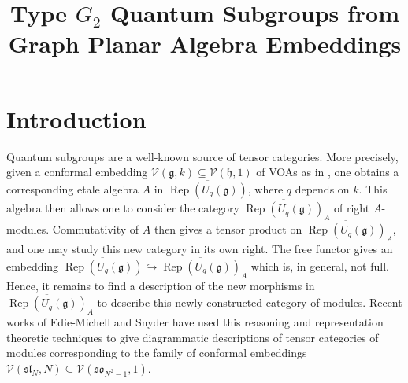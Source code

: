 \documentclass[pdflatex,sn-mathphys-num]{sn-jnl}%
\theoremstyle{thmstyleone}%
\theoremstyle{thmstyletwo}%
\theoremstyle{thmstylethree}%
\newcommand{\VV}{\mathcal{V}}
\newcommand{\ol}{\overline}
\renewcommand{\gg}{\mathfrak{g}}
\newcommand{\hh}{\mathfrak{h}}
\renewcommand{\sl}{\mathfrak{sl}}
\newcommand{\so}{\mathfrak{so}}
\DeclareMathOperator{\Rep}{Rep}
\begin{document}
\title{Type $G_2$ Quantum Subgroups from Graph Planar Algebra Embeddings}


\author{ }


\maketitle


\section{Introduction}\label{sec:intro}
Quantum subgroups are a well-known source of tensor categories.
More precisely, given a conformal embedding $\VV(\gg,k) \subseteq \VV(\hh,1)$ of VOAs 
as in \cite{DMNO}, one obtains a corresponding etale algebra $A$ in $\ol{\Rep(U_{q}(\gg))}$,
where $q$ depends on $k$.
This algebra then allows one to consider the category $\ol{\Rep(U_{q}(\gg))}_A$ of right $A$-modules.
Commutativity of $A$ then gives a tensor product on $\ol{\Rep(U_{q}(\gg))}_A$, and one may study this
new category in its own right.
The free functor gives an embedding $\ol{\Rep(U_{q}(\gg))} \hookrightarrow \ol{\Rep(U_{q}(\gg))}_A$
which is, in general, not full.
Hence, it remains to find a description of the new morphisms in $\ol{\Rep(U_{q}(\gg))}_A$ 
to describe this newly constructed category of modules.
Recent works of Edie-Michell and Snyder \cite{cain_noah} have used this reasoning and 
representation theoretic techniques to give diagrammatic descriptions of tensor categories of modules
corresponding to the family of conformal embeddings $\VV(\sl_N,N) \subseteq \VV(\so_{N^2-1},1)$.
\end{document}
